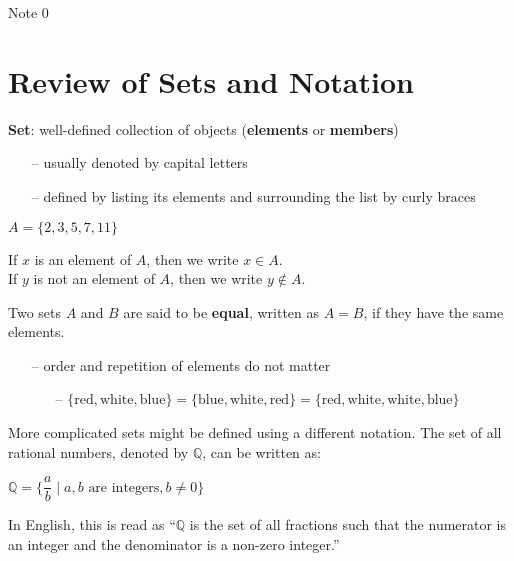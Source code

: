 \documentclass[12pt,a4paper]{article}
\author{Henry Yu}
\begin{document}
\raggedright

\begin{center}
	\huge{Note 0}
\end{center}

\section*{Review of Sets and Notation}

\textbf{Set}: well-defined collection of objects (\textbf{elements} or \textbf{members})

\begin{itemize}
	\item[--] usually denoted by capital letters
	\item[--] defined by listing its elements and surrounding the list by curly braces
\end{itemize}

\begin{center}
	$A=\{2, 3, 5, 7, 11\}$
\end{center}

If $x$ is an element of $A$, then we write $x \in A$. \\
If $y$ is not an element of $A$, then we write $y \notin A$. \\

\bigbreak

Two sets $A$ and $B$ are said to be \textbf{equal}, written as $A=B$, if they have the same elements.
\begin{itemize}
	\item[--] order and repetition of elements do not matter
	\begin{itemize}
		\item[--] $\{\text{red}, \text{white}, \text{blue}\}=\{\text{blue},\text{white},\text{red}\}=\{\text{red},\text{white},\text{white},\text{blue}\}$
	\end{itemize}
\end{itemize}

More complicated sets might be defined using a different notation. The set of all rational numbers, denoted by $\mathbb{Q}$, can be written as:
\begin{center}
	$\mathbb{Q}=\{\dfrac{a}{b}\mid a, b\text{ are integers}, b\neq0\}$
\end{center}

In English, this is read as ``$\mathbb{Q}$ is the set of all fractions such that the numerator is an integer and the denominator is a non-zero integer.''
\end{document}
